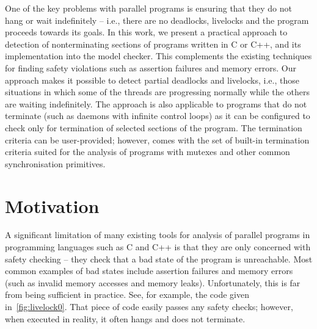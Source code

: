 
\bigskip\noindent
One of the key problems with parallel programs is ensuring that they do not hang or wait indefinitely -- i.e., there are no deadlocks, livelocks and the program proceeds towards its goals.
In this work, we present a practical approach to detection of nonterminating sections of programs written in C or C++, and its implementation into the \divine model checker.
This complements the existing techniques for finding safety violations such as assertion failures and memory errors.
Our approach makes it possible to detect partial deadlocks and livelocks, i.e., those situations in which some of the threads are progressing normally while the others are waiting indefinitely.
The approach is also applicable to programs that do not terminate (such as daemons with infinite control loops) as it can be configured to check only for termination of selected sections of the program.
The termination criteria can be user-provided; however, \divine comes with the set of built-in termination criteria suited for the analysis of programs with mutexes and other common synchronisation primitives.

\section{Motivation}

A significant limitation of many existing tools for analysis of parallel
programs in programming languages such as C and C++ is that they are only concerned with safety checking -- they check that a bad state of the program is unreachable.
Most common examples of bad states include assertion failures and memory errors (such as invalid memory accesses and memory leaks).
Unfortunately, this is far from being sufficient in practice.
See, for example, the code given in~\autoref{fig:livelock0}.
That piece of code easily passes any safety checks; however, when executed in reality, it often hangs and does not terminate.

